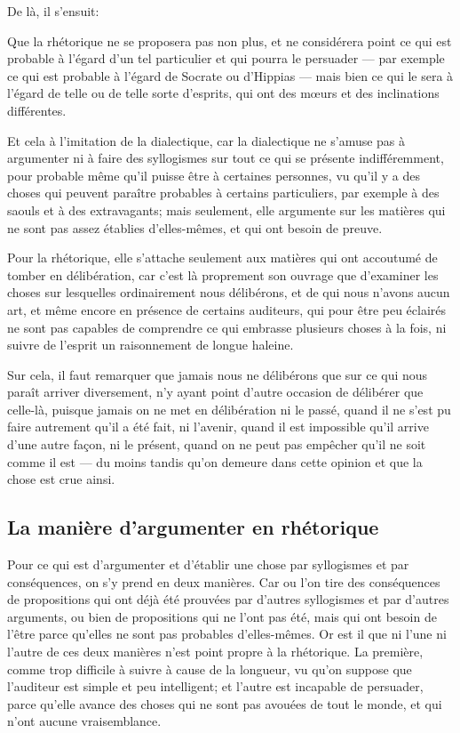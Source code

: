 De là, il s'ensuit:

\begin{emphpar}
     Que la rhétorique ne se proposera pas non plus, et ne considérera point ce qui est probable à l'égard d'un tel particulier
      et qui pourra le persuader --- par exemple ce qui est probable à l'égard de Socrate ou d'Hippias --- mais bien ce qui le
      sera à l'égard de telle ou de telle sorte d'esprits, qui ont des mœurs et des inclinations différentes.
\end{emphpar}

Et cela à l'imitation de la dialectique, car la dialectique ne s'amuse pas à argumenter ni à faire des syllogismes sur tout ce qui se présente
indifféremment, pour probable même qu'il puisse être à certaines personnes, vu qu'il y a des choses qui peuvent paraître probables à certains
particuliers, par exemple à des saouls et à des extravagants; mais seulement, elle argumente sur les matières qui ne sont pas assez établies
d'elles-mêmes, et qui ont besoin de preuve. 

Pour la rhétorique, elle s'attache seulement aux matières qui ont accoutumé de tomber en délibération, car c'est là proprement son ouvrage que
d'examiner les choses sur lesquelles ordinairement nous délibérons, et de qui nous n'avons aucun art, et même encore en présence de certains
auditeurs, qui pour être peu éclairés ne sont pas capables de comprendre ce qui embrasse plusieurs choses à la fois, ni suivre de l'esprit un
raisonnement de longue haleine.

Sur cela, il faut remarquer que jamais nous ne délibérons que sur ce qui nous paraît arriver diversement, n'y ayant point d'autre occasion de
délibérer que celle-là, puisque jamais on ne met en délibération ni le passé, quand il ne s'est pu faire autrement qu'il a été fait, ni l'avenir,
quand  il est impossible qu'il arrive d'une autre façon, ni le présent, quand on ne peut pas empêcher qu'il ne soit comme il est --- du moins
tandis qu'on demeure dans cette opinion et que la chose est crue ainsi.

\subsection{La manière d'argumenter en rhétorique}

Pour ce qui est d'argumenter et d'établir une chose par syllogismes et par conséquences, on s'y prend en deux manières. Car ou l'on tire des
conséquences de propositions qui ont déjà été prouvées par d'autres syllogismes et par d'autres arguments, ou bien de propositions qui ne l'ont
pas été, mais qui ont besoin de l'être parce qu'elles ne sont pas probables d'elles-mêmes. Or est il que ni l'une ni l'autre de ces deux manières
n'est point propre à la rhétorique. La première, comme trop difficile à suivre à cause de la longueur, vu qu'on suppose que l'auditeur est simple
et peu intelligent; et l'autre est incapable de persuader, parce qu'elle avance des choses qui ne sont pas avouées de tout le monde, et qui n'ont
aucune vraisemblance. 

